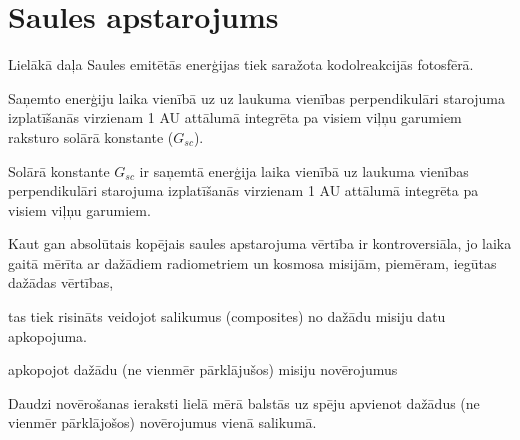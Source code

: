 


\section{Saules apstarojums}

Lielākā daļa Saules emitētās enerģijas tiek saražota kodolreakcijās fotosfērā.

Saņemto enerģiju laika vienībā uz uz laukuma vienības perpendikulāri starojuma izplatīšanās virzienam 1 AU attālumā integrēta pa visiem viļņu garumiem raksturo solārā konstante ($G_{sc}$).



Solārā konstante $G_{sc}$ ir saņemtā enerģija laika vienībā uz laukuma vienības perpendikulāri starojuma izplatīšanās virzienam 1 AU attālumā integrēta pa visiem viļņu garumiem.\cite{ThermalProcesses}


Kaut gan absolūtais kopējais saules apstarojuma vērtība ir kontroversiāla, jo laika gaitā mērīta ar dažādiem radiometriem un kosmosa misijām, piemēram, 
iegūtas dažādas vērtības,

tas tiek risināts veidojot salikumus (composites) no dažādu misiju datu apkopojuma.

apkopojot dažādu (ne vienmēr pārklājušos) misiju novērojumus



Daudzi novērošanas ieraksti lielā mērā balstās uz spēju apvienot dažādus (ne vienmēr pārklājošos) novērojumus vienā salikumā.


